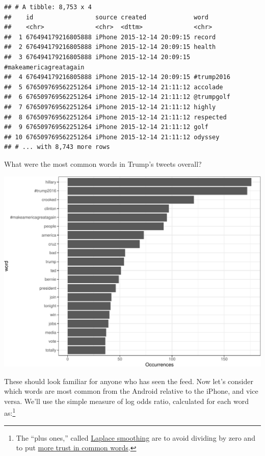 \documentclass[
]{article}
\begin{document}
\begin{verbatim}
## # A tibble: 8,753 x 4
##    id                 source created             word                  
##    <chr>              <chr>  <dttm>              <chr>                 
##  1 676494179216805888 iPhone 2015-12-14 20:09:15 record                
##  2 676494179216805888 iPhone 2015-12-14 20:09:15 health                
##  3 676494179216805888 iPhone 2015-12-14 20:09:15 #makeamericagreatagain
##  4 676494179216805888 iPhone 2015-12-14 20:09:15 #trump2016            
##  5 676509769562251264 iPhone 2015-12-14 21:11:12 accolade              
##  6 676509769562251264 iPhone 2015-12-14 21:11:12 @trumpgolf            
##  7 676509769562251264 iPhone 2015-12-14 21:11:12 highly                
##  8 676509769562251264 iPhone 2015-12-14 21:11:12 respected             
##  9 676509769562251264 iPhone 2015-12-14 21:11:12 golf                  
## 10 676509769562251264 iPhone 2015-12-14 21:11:12 odyssey               
## # ... with 8,743 more rows
\end{verbatim}

What were the most common words in Trump's tweets overall?

\includegraphics{Live_Demo_files/figure-latex/tweet_words_plot-1.pdf}

These should look familiar for anyone who has seen the feed. Now let's
consider which words are most common from the Android relative to the
iPhone, and vice versa. We'll use the simple measure of log odds ratio,
calculated for each word as:\footnote{The ``plus ones,'' called
  \href{https://en.wikipedia.org/wiki/Additive_smoothing}{Laplace
  smoothing} are to avoid dividing by zero and to put
  \href{http://varianceexplained.org/r/empirical_bayes_baseball/}{more
  trust in common words}.}
\end{document}
